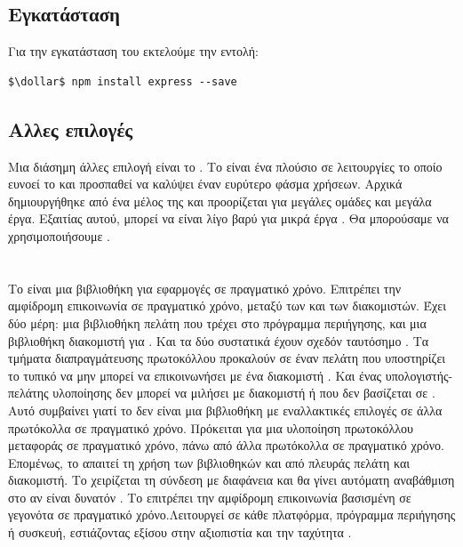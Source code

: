 \subsection*{Εγκατάσταση}
\pSpace Για την εγκατάσταση του  εκτελούμε την εντολή:
    \begin{lstlisting}[language=command.com]
    $\dollar$ npm install express --save
    \end{lstlisting}

\subsection*{Αλλες επιλογές}
\pSpace Μια διάσημη άλλες επιλογή είναι το  . Το  είναι ένα πλούσιο σε λειτουργίες  το οποίο ευνοεί το  και προσπαθεί να καλύψει έναν ευρύτερο φάσμα χρήσεων. Αρχικά δημιουργήθηκε από ένα μέλος της  και προορίζεται για μεγάλες ομάδες και μεγάλα έργα. Εξαιτίας αυτού, μπορεί να είναι λίγο βαρύ για μικρά έργα . Θα μπορούσαμε να χρησιμοποιήσουμε .


\section{}
\pSpace Το  είναι μια βιβλιοθήκη  για εφαρμογές  σε πραγματικό χρόνο. Επιτρέπει την αμφίδρομη επικοινωνία σε πραγματικό χρόνο, μεταξύ των  και των διακομιστών. Έχει δύο μέρη: μια βιβλιοθήκη πελάτη που τρέχει στο πρόγραμμα περιήγησης, και μια βιβλιοθήκη διακομιστή για . Και τα δύο συστατικά έχουν σχεδόν ταυτόσημο . Τα τμήματα διαπραγμάτευσης πρωτοκόλλου προκαλούν σε έναν πελάτη που υποστηρίζει το τυπικό  να μην μπορεί να επικοινωνήσει με ένα διακομιστή . Και ένας υπολογιστής-πελάτης υλοποίησης  δεν μπορεί να μιλήσει με διακομιστή  ή  που δεν βασίζεται σε . Αυτό συμβαίνει γιατί το  δεν είναι μια βιβλιοθήκη  με εναλλακτικές επιλογές σε άλλα πρωτόκολλα σε πραγματικό χρόνο. Πρόκειται για μια  υλοποίηση πρωτοκόλλου μεταφοράς σε πραγματικό χρόνο, πάνω από άλλα πρωτόκολλα σε πραγματικό χρόνο. Επομένως, το  απαιτεί τη χρήση των βιβλιοθηκών  και από πλευράς πελάτη και διακομιστή. Το  χειρίζεται τη σύνδεση με διαφάνεια και θα γίνει αυτόματη αναβάθμιση στο  αν είναι δυνατόν . Το  επιτρέπει την αμφίδρομη επικοινωνία βασισμένη σε γεγονότα σε πραγματικό χρόνο.Λειτουργεί σε κάθε πλατφόρμα, πρόγραμμα περιήγησης ή συσκευή, εστιάζοντας εξίσου στην αξιοπιστία και την ταχύτητα .


